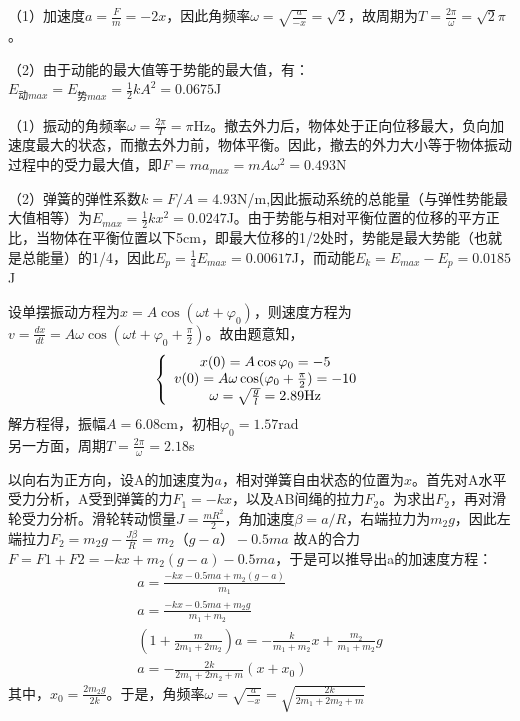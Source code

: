 \solve
（1）加速度$a=\frac{F}{m}=-2x$，因此角频率$\omega=\sqrt{\frac{a}{-x}}=\sqrt{2}$，故周期为$T=\frac{2\pi}{\omega}=\sqrt{2}\pi$。

（2）由于动能的最大值等于势能的最大值，有：$E_{\text{动}max}=E_{\text{势}max}=\frac{1}{2}kA^2=0.0675$J

\exercise

\solve
（1）振动的角频率$\omega=\frac{2\pi}{T}=\pi$Hz。撤去外力后，物体处于正向位移最大，负向加速度最大的状态，而撤去外力前，物体平衡。因此，撤去的外力大小等于物体振动过程中的受力最大值，即$F=ma_{max}=mA\omega^2=0.493$N

（2）弹簧的弹性系数$k=F/A=4.93$N/m,因此振动系统的总能量（与弹性势能最大值相等）为$E_{max}=\frac{1}{2}kx^2=0.0247$J。由于势能与相对平衡位置的位移的平方正比，当物体在平衡位置以下5cm，即最大位移的1/2处时，势能是最大势能（也就是总能量）的1/4，因此$E_p=\frac{1}{4}E_{max}=0.00617$J，而动能$E_ k=E_{max}-E_ p=0.0185$J

\exercise

\solve
设单摆振动方程为$x=A\cos(\omega t+\varphi_0)$，则速度方程为$v=\frac{dx}{dt}=A\omega\cos(\omega t+\varphi_0+\frac{\pi}{2})$。故由题意知，
\begin{equation*}
  \left\{
   \begin{array}{c}
   x(0)=A\cos{\varphi_0} = -5  \\
   v(0)=A\omega\cos(\varphi_0+\frac{\pi}{2}) = -10  \\
   \omega=\sqrt{\frac{g}{l}}=2.89{\rm Hz}   \\
   \end{array}
  \right.
\end{equation*}
解方程得，振幅$A=6.08$cm，初相${\varphi_0}=1.57$rad\\
另一方面，周期$T=\frac{2\pi}{\omega}=2.18$s

\exercise

\solve
以向右为正方向，设A的加速度为$a$，相对弹簧自由状态的位置为$x$。首先对A水平受力分析，A受到弹簧的力$F_1=-kx$，以及AB间绳的拉力$F_2$。为求出$F_2$，再对滑轮受力分析。滑轮转动惯量$J=\frac{mR^2}{2}$，角加速度$\beta=a/R$，右端拉力为$m_2g$，因此左端拉力$F_2=m_2g-\frac{J\beta}{R}=m_2（g-a）-0.5ma$
故A的合力$F=F1+F2=-kx+m_2(g-a)-0.5ma$，于是可以推导出a的加速度方程：
\begin{equation*}
\begin{split}
a=\frac{-kx-0.5ma+m_2(g-a)}{m_1}\\
a=\frac{-kx-0.5ma+m_2g}{m_1+m_2}\\
(1+\frac{m}{2m_1+2m_2})a=-\frac{k}{m_1+m_2}x+\frac{m_2}{m_1+m_2}g\\
a=-\frac{2k}{2m_1+2m_2+m}(x+x_0)
\end{split}
\end{equation*}
其中，$x_0=\frac{2m_2g}{2k}$。于是，角频率$\omega=\sqrt{\frac{a}{-x}}=\sqrt{\frac{2k}{2m_1+2m_2+m}}$
